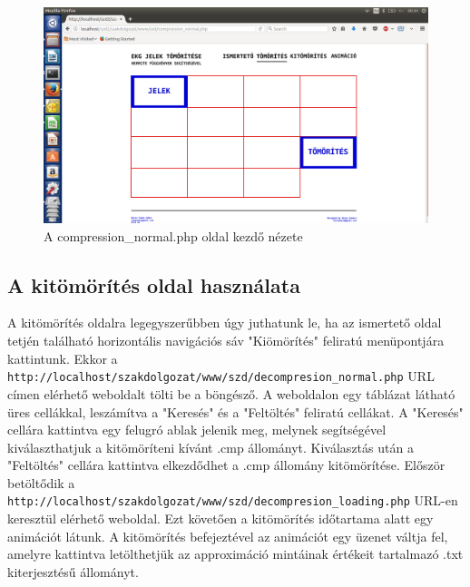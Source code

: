 \documentclass[oneside,titlepage,12pt,a4paper]{report}
\begin{document}
\begin{figure}[H]
\begin{center}
  \includegraphics[width=150mm]{./Abrak/WWW/tom_alap.png}
  \caption{A compression\_normal.php oldal kezdő nézete}
\end{center}
\end{figure}

\subsection*{A kitömörítés oldal használata}

A kitömörítés oldalra legegyszerűbben úgy juthatunk le, ha az ismertető oldal tetjén található horizontális navigációs sáv "Kiömörítés" feliratú menüpontjára kattintunk. Ekkor a \texttt{http://localhost/szakdolgozat/www/szd/decompresion\_normal.php} \linebreak URL címen elérhető weboldalt tölti be a böngésző. A weboldalon egy táblázat látható üres cellákkal, leszámítva a "Keresés" és a "Feltöltés" feliratú cellákat. A "Keresés" cellára kattintva egy felugró ablak jelenik meg, melynek segítségével kiválaszthatjuk a kitömöríteni kívánt .cmp állományt. Kiválasztás után a "Feltöltés" cellára kattintva elkezdődhet a .cmp állomány kitömörítése. Először betöltődik a \texttt{http://localhost/szakdolgozat/www/szd/decompresion\_loading.php} URL-en \linebreak keresztül elérhető weboldal. Ezt követően a kitömörítés időtartama alatt egy animációt látunk. A kitömörítés befejeztével az animációt egy üzenet váltja fel, amelyre kattintva letölthetjük az approximáció mintáinak értékeit tartalmazó .txt kiterjesztésű állományt.
\end{document}
